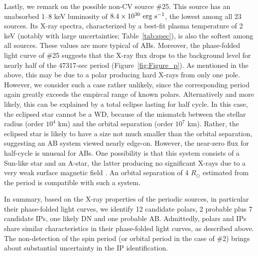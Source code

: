 \documentclass[fleqn,usenatbib]{mnras}
\begin{document}
Lastly, we remark on the possible non-CV source \#25. This source has an unabsorbed 1--8 keV luminosity of $\rm 8.4 \times 10^{30}~erg~s^{-1}$, the lowest among all 23 sources. Its X-ray spectra, characterized by a best-fit plasma temperature of 2 keV (notably with large uncertainties; Table~\ref{tab:spec}), is also the softest among all sources.
These values are more typical of ABs. 
Moreover, the phase-folded light curve of \#25 suggests that the X-ray flux drops to the background level for nearly half of the 47317-sec period (Figure~\ref{fig:Figure_p}). 
As mentioned in the above, this may be due to a polar producing hard X-rays from only one pole.
However, we consider such a case rather unlikely, since the corresponding period again greatly exceeds the empircal range of known polars.
Alternatively and more likely, this can be explained by a total eclipse lasting for half cycle.
In this case, the eclipsed star cannot be a WD, because of the mismatch between the stellar radius (order $10^4$ km)
and the orbital separation (order $10^7$ km).
Rather, the eclipsed star is likely to have a size not much smaller than the orbital separation, suggesting an AB system viewed nearly edge-on.
However, the near-zero flux for half-cycle is unusual for ABs. One possibility is that this system consists of a Sun-like star and an A-star, the latter producing no significant X-rays due to a very weak surface magnetic field \citep{2004A&ARv..12...71G}. 
An orbital separation of 4 $R_\odot$ estimated from the period is compatible with such a system. 

In summary, based on the X-ray properties of the periodic sources, in particular their phase-folded light curves, we identify 12 candidate polars, 2 probable plus 7 candidate IPs, one likely DN and one probable AB. 
Admittedly, polars and IPs share similar characteristics in their phase-folded light curves, as described above. The non-detection of the spin period (or orbital period in the case of \#2) brings about substantial uncertainty in the IP identification.
\end{document}
